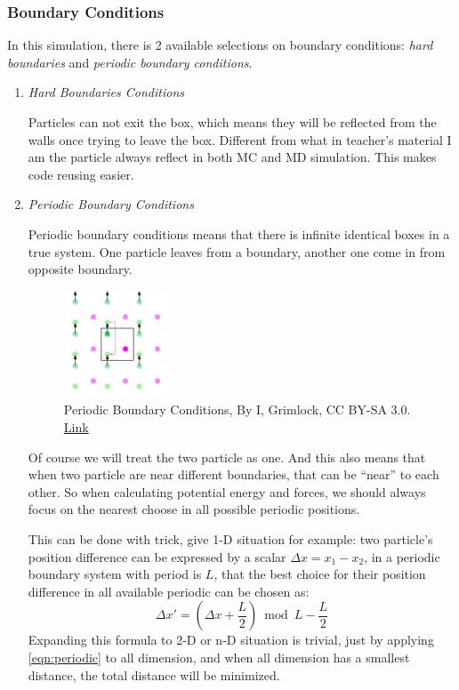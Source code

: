\documentclass[UTF8,a4paper,no-math]{article}
\begin{document}
\subsubsection{Boundary Conditions}
In this simulation, there is 2 available selections on boundary conditions: \textit{hard boundaries} and \textit{periodic boundary conditions}.
\begin{enumerate}
	\item \textit{Hard Boundaries Conditions}

	      Particles can not exit the box, which means they will be reflected from the walls once trying to leave the box. Different from what in teacher's material
	      I am the particle always reflect in both MC and MD simulation. This makes code reusing easier.
	\item \textit{Periodic Boundary Conditions}

	      Periodic boundary conditions means that there is infinite identical boxes in a true system. One particle leaves from a boundary, another one come in from opposite
	      boundary.
	      \begin{figure}[h]
		      \centering
		      \includegraphics[width=0.3\textwidth]{fig/1024px-Limiteperiodicite.png}
		      \caption{Periodic Boundary Conditions, By I, Grimlock, CC BY-SA 3.0. \href{https://commons.wikimedia.org/wiki/File:Limiteperiodicite.svg}{Link}}
		      \label{fig:Periodic}
	      \end{figure}
	      Of course we will treat the two particle as one. And this also means that when two particle are near different boundaries, that can be ``near'' to each other. So when calculating
	      potential energy and forces, we should always focus on the nearest choose in all possible periodic positions.

	      This can be done with trick, give 1-D situation for example: two particle's position difference can be expressed by a scalar $\Delta x = x_1 - x_2$, in a periodic boundary system with
	      period is $L$, that the best choice for their position difference in all available periodic can be chosen as:
	      \begin{equation}
		      \Delta x' = \left(\Delta x + \frac{L}{2}\right)\bmod L - \frac{L}{2}
		      \label{eqn:periodic}
	      \end{equation}
	      Expanding this formula to 2-D or n-D situation is trivial, just by applying \eqref{eqn:periodic} to all dimension, and when all dimension has a smallest distance, the total distance will
	      be minimized.


\end{enumerate}
\end{document}

